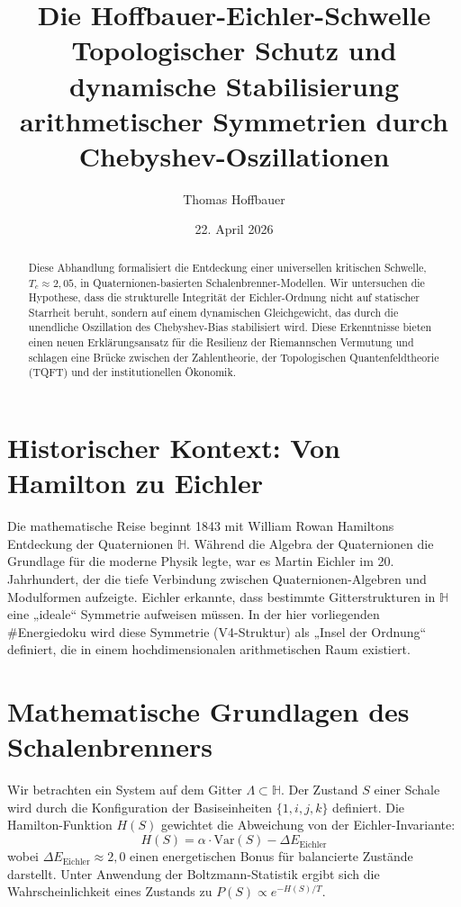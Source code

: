 \documentclass[11pt,a4paper,oneside]{article}
\title{
    \textbf{\huge Die Hoffbauer-Eichler-Schwelle}\\
    \large Topologischer Schutz und dynamische Stabilisierung arithmetischer Symmetrien durch Chebyshev-Oszillationen
}
\author{Thomas Hoffbauer}
\date{22. April 2026}
\begin{document}
\maketitle

\begin{abstract}
Diese Abhandlung formalisiert die Entdeckung einer universellen kritischen Schwelle, $T_c \approx 2,05$, in Quaternionen-basierten Schalenbrenner-Modellen. Wir untersuchen die Hypothese, dass die strukturelle Integrität der Eichler-Ordnung nicht auf statischer Starrheit beruht, sondern auf einem dynamischen Gleichgewicht, das durch die unendliche Oszillation des Chebyshev-Bias stabilisiert wird. Diese Erkenntnisse bieten einen neuen Erklärungsansatz für die Resilienz der Riemannschen Vermutung und schlagen eine Brücke zwischen der Zahlentheorie, der Topologischen Quantenfeldtheorie (TQFT) und der institutionellen Ökonomik.
\end{abstract}

\section{Historischer Kontext: Von Hamilton zu Eichler}
Die mathematische Reise beginnt 1843 mit William Rowan Hamiltons Entdeckung der Quaternionen $\mathbb{H}$. Während die Algebra der Quaternionen die Grundlage für die moderne Physik legte, war es Martin Eichler im 20. Jahrhundert, der die tiefe Verbindung zwischen Quaternionen-Algebren und Modulformen aufzeigte. Eichler erkannte, dass bestimmte Gitterstrukturen in $\mathbb{H}$ eine „ideale“ Symmetrie aufweisen müssen. In der hier vorliegenden \#Energiedoku wird diese Symmetrie (V4-Struktur) als „Insel der Ordnung“ definiert, die in einem hochdimensionalen arithmetischen Raum existiert.

\section{Mathematische Grundlagen des Schalenbrenners}
Wir betrachten ein System auf dem Gitter $\Lambda \subset \mathbb{H}$. Der Zustand $S$ einer Schale wird durch die Konfiguration der Basiseinheiten $\{1, i, j, k\}$ definiert. Die Hamilton-Funktion $H(S)$ gewichtet die Abweichung von der Eichler-Invariante:
\begin{equation}
    H(S) = \alpha \cdot \text{Var}(S) - \Delta E_{\text{Eichler}}
\end{equation}
wobei $\Delta E_{\text{Eichler}} \approx 2,0$ einen energetischen Bonus für balancierte Zustände darstellt. Unter Anwendung der Boltzmann-Statistik ergibt sich die Wahrscheinlichkeit eines Zustands zu $P(S) \propto e^{-H(S)/T}$.
\end{document}
